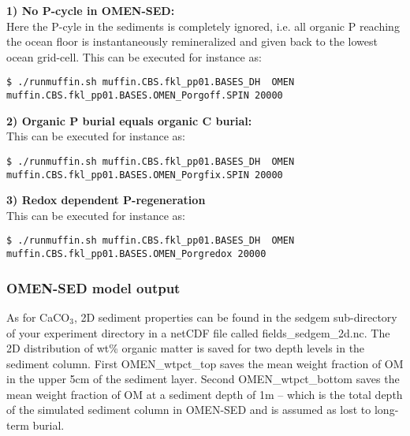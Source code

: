\documentclass[11pt,fleqn]{book} %
\begin{document}
\vspace{1mm}
\noindent 
\textbf{1) No P-cycle in OMEN-SED:}\\
Here the P-cyle in the sediments is completely ignored, i.e. all organic P reaching the ocean floor is instantaneously remineralized and given back to the lowest ocean grid-cell. This can be executed for instance as:
\vspace{-1mm}
\begin{verbatim}
$ ./runmuffin.sh muffin.CBS.fkl_pp01.BASES_DH  OMEN 
muffin.CBS.fkl_pp01.BASES.OMEN_Porgoff.SPIN 20000
\end{verbatim}
\vspace{-1mm}

\vspace{1mm}
\noindent 
\textbf{2) Organic P burial equals organic C burial:}\\
This can be executed for instance as:
\vspace{-1mm}
\begin{verbatim}
$ ./runmuffin.sh muffin.CBS.fkl_pp01.BASES_DH  OMEN 
muffin.CBS.fkl_pp01.BASES.OMEN_Porgfix.SPIN 20000
\end{verbatim}
\vspace{-1mm}

\vspace{1mm}
\noindent 
\textbf{3) Redox dependent P-regeneration}\\
This can be executed for instance as:
\vspace{-1mm}
\begin{verbatim}
$ ./runmuffin.sh muffin.CBS.fkl_pp01.BASES_DH  OMEN 
muffin.CBS.fkl_pp01.BASES.OMEN_Porgredox 20000
\end{verbatim}
\vspace{-1mm}

%
\subsubsection*{OMEN-SED model output}
As for CaCO$_3$, 2D sediment properties can be found in  the \textsf{\footnotesize sedgem } sub-directory of your experiment directory  in a netCDF file called \textsf{\footnotesize fields\_sedgem\_2d.nc}. 
The 2D distribution of wt\% organic matter is saved for two depth levels in the sediment column. First \textsf{\footnotesize OMEN\_wtpct\_top} saves the mean weight fraction of OM in the upper 5cm of the sediment layer. 
Second \textsf{\footnotesize OMEN\_wtpct\_bottom} saves the mean weight fraction of OM at a sediment depth of 1m -- which is the total depth of the simulated sediment column in OMEN-SED and is assumed as lost to long-term burial. 
\end{document}

